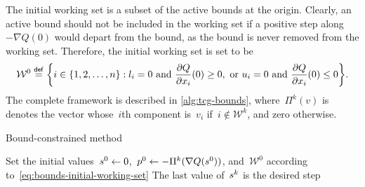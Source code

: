 The initial working set is a subset of the active bounds at the origin.
Clearly, an active bound should not be included in the working set if a positive step along~$-\nabla Q(0)$ would depart from the bound, as the bound is never removed from the working set.
Therefore, the initial working set is set to be
\begin{equation}
    \label{eq:bounds-initial-working-set}
    \mathcal{W}^0 \eqdef \set[\bigg]{i \in \set{1, 2, \dots, n} : \xl_i = 0 ~ \text{and} ~ \frac{\partial Q}{\partial \iter_i}(0) \ge 0, ~ \text{or} ~ \xu_i = 0 ~ \text{and} ~ \frac{\partial Q}{\partial \iter_i}(0) \le 0}.
\end{equation}
The complete framework is described in \cref{alg:tcg-bounds}, where~$\Pi^k(v)$ is denotes the vector whose~$i$th component is~$v_i$ if~$i \notin \mathcal{W}^k$, and zero otherwise.

\begin{algorithm}
    \caption{Bound-constrained  method}
    \label{alg:tcg-bounds}
    \DontPrintSemicolon
    \onehalfspacing
    Set the initial values~$\sstep[0] \gets 0$,~$\pstep[0] \gets -\Pi^k(\nabla Q(\sstep[0]))$, and~$\mathcal{W}^0$ according to~\cref{eq:bounds-initial-working-set}\;
    The last value of~$\sstep[k]$ is the desired step\;
\end{algorithm}


